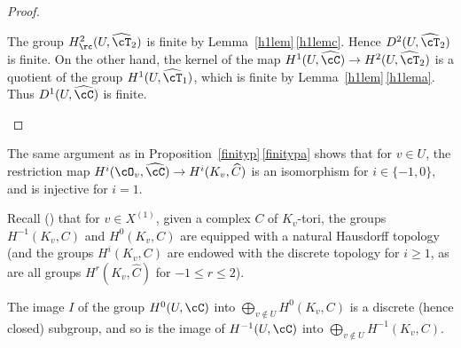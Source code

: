 \begin{proof}
\begin{enumeratea}
The group $H^2_\rc(U,\widehat \cT_2)$
is finite by Lemma~\ref{h1lem}\,\eqref{h1lemc}.
Hence $D^2(U, \widehat \cT_2)$ is finite.
On the other hand, the kernel of the map $H^1(U,\widehat \cC)
\to H^2(U,\widehat \cT_2)$ is a quotient of the group
$H^1(U,\widehat \cT_1)$, which is finite by Lemma~\ref{h1lem}\,\eqref{h1lema}.
Thus $D^1(U,\widehat \cC)$ is finite.\qedhere
\end{enumeratea}
\end{proof}

\begin{rema} \label{localisom}
The same argument as in Proposition~\ref{finityp}\,\eqref{finitypa} shows that for $v \in U$, the restriction
map $H^i(\cO_v,\widehat \cC) \to H^i(K_v,\widehat C)$
is an isomorphism for $i \in \{-1, 0\}$, and is injective for $i=1$.
\end{rema}

Recall (\cite[\S3]{demphd})
that for $v \in X^{(1)}$, given a complex $C$ of $K_v$-tori, the groups $H^{-1}(K_v,C)$ and
$H^0(K_v,C)$ are equipped with a natural Hausdorff topology (and
the groups $H^i(K_v,C)$ are endowed
with the discrete topology for $i \geq 1$, as
are all groups $H^r(K_v, \widehat C)$ for $-1 \leq r \leq 2$).

\begin{lem} \label{closedimage}
The image $I$ of the group $H^0(U,\cC)$ into $\bigoplus_{v \not \in U}
H^0(K_v,C)$ is a discrete (hence closed) subgroup, and so is the
image of $H^{-1}(U,\cC)$ into $\bigoplus_{v \not \in U} H^{-1}(K_v,C)$.
\end{lem}

